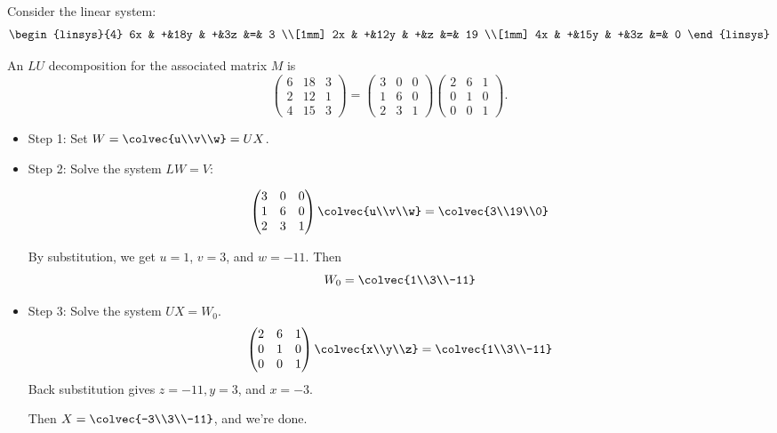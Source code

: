 \begin{example}
Consider the linear system:
\[
      \begin{linsys}{4}
            6x & +&18y & +&3z         &=& 3  \\[1mm]
            2x & +&12y & +&z	    &=& 19 \\[1mm]
            4x & +&15y & +&3z         &=& 0  
      \end{linsys}
\]

An $LU$ decomposition for the associated matrix $M$ is
\[
\begin{pmatrix}
6 & 18 & 3 \\
2 & 12 & 1 \\
4 & 15 & 3 
\end{pmatrix} =
\begin{pmatrix}
3 & 0 & 0 \\
1 & 6 & 0 \\
2 & 3 & 1 
\end{pmatrix}
\begin{pmatrix}
2 & 6 & 1 \\
0 & 1 & 0 \\
0 & 0 & 1 
\end{pmatrix}.
\]

\begin{itemize}
\item{Step 1:} \hypertarget{LUproc}{Set} $W=\colvec{u\\v\\w}=UX$.  

\item{Step 2:} Solve the system $LW=V$:

\[
\begin{pmatrix}
3 & 0 & 0 \\
1 & 6 & 0 \\
2 & 3 & 1 
\end{pmatrix}
\colvec{u\\v\\w} =
\colvec{3\\19\\0}
\]

By substitution, we get $u=1$, $v=3$, and $w=-11$.  Then 
\[W_0=\colvec{1\\3\\-11}\]

\item{Step 3:} Solve the system $UX=W_0$.  
\[
\begin{pmatrix}
2 & 6 & 1 \\
0 & 1 & 0 \\
0 & 0 & 1 
\end{pmatrix}
\colvec{x\\y\\z} =
\colvec{1\\3\\-11}
\]
Back substitution gives $z=-11, y=3$, and $x=-3$.  

Then $X=\colvec{-3\\3\\-11}$, and we're done.
\end{itemize}
\end{example}

